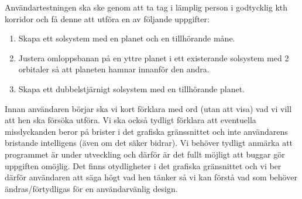 Användartestningen ska ske genom att ta tag i lämplig person
i godtycklig kth korridor och få denne att utföra en av följande uppgifter:
\begin{enumerate}
    \item Skapa ett solsystem med en planet och en tillhörande måne.
    \item Justera omloppsbanan på en yttre planet i ett existerande
        solsystem med 2 orbitaler så att planeten hamnar innanför den andra.
    \item Skapa ett dubbelstjärnigt solsystem med en tillhörande planet.
\end{enumerate}

Innan användaren börjar ska vi kort förklara med ord (utan att visa)
vad vi vill att hen ska försöka utföra.
Vi ska också tydligt förklara att eventuella misslyckanden
beror på brister i det grafiska gränssnittet och
inte användarens bristande intelligens (även om det säker bidrar).
Vi behöver tydligt anmärka att programmet är under utveckling och
därför är det fullt möjligt att buggar gör uppgiften omöjlig.
Det finns otydligheter i det grafiska gränsnittet och vi ber därför
användaren att säga högt vad hen tänker så vi kan förstå vad som
behöver ändras/förtydligas för en användarvänlig design.


